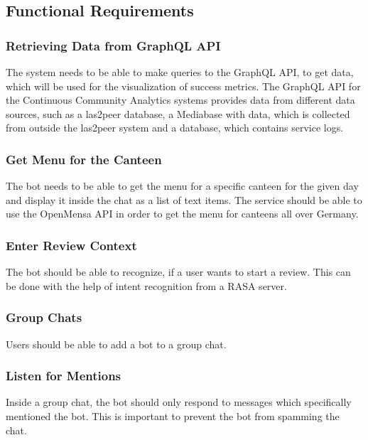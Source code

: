 \subsection{Functional Requirements}

\subsubsection{Retrieving Data from GraphQL API}
The system needs to be able to make queries to the GraphQL API, to get data, which will be used for the visualization of success metrics. The GraphQL API  for the Continuous Community Analytics systems provides data from different data sources, such as a las2peer database, a Mediabase with data, which is collected from outside the las2peer system and a database, which contains service logs.

\subsubsection{Get Menu for the Canteen} The bot needs to be able to get the menu for a specific canteen for the given day and display it inside the chat as a list of text items. The service should be able to use the OpenMensa API \footnotemark in order to get the menu for canteens all over Germany.


\subsubsection{Enter Review Context} The bot should be able to recognize, if a user wants to start a review. This can be done with the help of intent recognition from a RASA server.

\subsubsection{Group Chats} Users should be able to add a bot to a group chat.

\subsubsection{Listen for Mentions} Inside a group chat, the bot should only respond to messages which specifically mentioned the bot. This is important to prevent the bot from spamming the chat.


